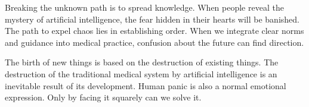 \documentclass[paper=a4, fontsize=11pt]{scrartcl} %
\numberwithin{equation}{section} %
\numberwithin{figure}{section} %
\numberwithin{table}{section} %
\begin{document}
Breaking the unknown path is to spread knowledge. When people reveal the mystery of artificial intelligence, the fear hidden in their hearts will be banished.
The path to expel chaos lies in establishing order. When we integrate clear norms and guidance into medical practice, confusion about the future can find direction.


The birth of new things is based on the destruction of existing things. The destruction of the traditional medical system by artificial intelligence is an inevitable 
result of its development. Human panic is also a normal emotional expression. Only by facing it squarely can we solve it.
























\end{document}
